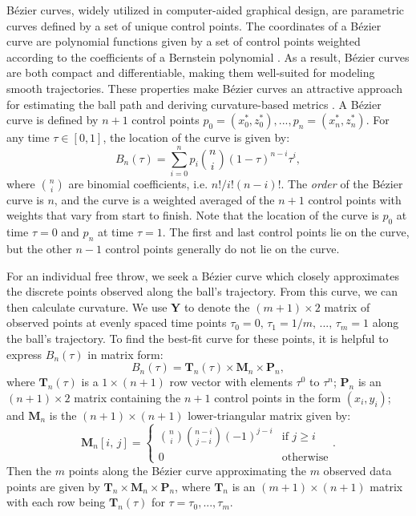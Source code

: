 \documentclass[Review,sageh,times,doublespace]{sagej}
\begin{document}
            Bézier curves, widely utilized in computer-aided graphical design, are parametric curves defined by a set of unique control points. The coordinates of a Bézier curve are polynomial functions given by a set of control points weighted according to the coefficients of a Bernstein polynomial \citep{baydas_defining_2019}. As a result, Bézier curves are both compact and differentiable, making them well-suited for modeling smooth trajectories. These properties make Bézier curves an attractive approach for estimating the ball path and deriving curvature-based metrics \citep{slegers_role_2024}. A Bézier curve is defined by \(n + 1\) control points \(p_0 = (x_0^*, z_0^*), ..., p_n = (x_n^*, z_n^*)\). For any time \(\tau \in [0, 1]\), the location of the curve is given by:
            \begin{equation}
              \label{eqn:bezier}
              B_n(\tau) = \sum_{i=0}^{n} p_i \binom{n}{i} (1 - \tau)^{n-i} \tau^i,
            \end{equation}
            where \( \binom{n}{i} \) are binomial coefficients, i.e. $n! / i! (n - i)!$. The {\it order} of the Bézier curve is \(n\), and the curve is a weighted averaged of the \(n+1\) control points with weights that vary from start to finish. Note that the location of the curve is \(p_0\) at time \(\tau =0\) and \(p_n\) at time \(\tau=1\). The first and last control points lie on the curve, but the other \(n - 1\) control points generally do not lie on the curve.

            For an individual free throw, we seek a Bézier curve which closely approximates the discrete points observed along the ball's trajectory. From this curve, we can then calculate curvature. We use \(\mathbf{Y}\) to denote the \( (m + 1) \times 2\) matrix of observed points at evenly spaced time points $\tau_0 = 0,\, \tau_1 = 1 / m,\, ...,\, \tau_m = 1$ along the ball's trajectory. To find the best-fit curve for these points, it is helpful to express \(B_n(\tau)\) in matrix form:
            \[
              B_n(\tau) = \mathbf{T}_n(\tau) \times \mathbf{M}_n \times \mathbf{P}_n,
            \]
            where \( \mathbf{T}_n(\tau) \) is a \( 1 \times (n+1) \) row vector with elements \( \tau^0 \) to \( \tau^n \); \( \mathbf{P}_n \) is an \( (n+1) \times 2 \) matrix containing the \( n+1 \) control points in the form \( (x_i, y_i) \); and \( \mathbf{M}_n \) is the \( (n+1) \times (n+1) \) lower-triangular matrix given by:
            \[
              \mathbf{M}_n[i,\, j] = \begin{cases}
                  \binom{n}{i} \binom{n - i} {j - i} (-1)^{j - i} & \mbox{if } j \ge i\\
                  0 & \mbox{otherwise}
              \end{cases}.
            \]
            Then the $m$ points along the Bézier curve approximating the $m$ observed data points are given by $\mathbf{T}_n \times \mathbf{M}_n \times \mathbf{P}_n$, where \( \mathbf{T}_n \) is an \( (m + 1) \times (n+1) \) matrix with each row being \( \mathbf{T}_n(\tau) \) for $\tau = \tau_0, ..., \tau_m$.
\end{document}
